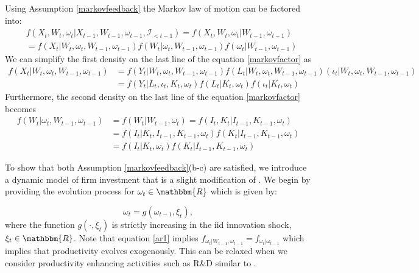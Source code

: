 \documentclass{article}
\begin{document}
Using Assumption \eqref{markovfeedback} the Markov law of motion can be factored into:
\begin{equation} \label{markovfactor}
    \begin{split}
        &f(X_{t}, W_{t}, \omega_{t}|X_{t-1}, W_{t-1}, \omega_{t-1}, \mathcal{I}_{<t-1})=f(X_{t}, W_{t}, \omega_{t}|W_{t-1}, \omega_{t-1})\\
        &=f(X_{t}|W_{t}, \omega_{t}, W_{t-1}, \omega_{t-1})f(W_{t}|\omega_{t}, W_{t-1}, \omega_{t-1})f(\omega_{t}|W_{t-1}, \omega_{t-1})
    \end{split}
\end{equation} 
We can simplify the first density on the last line of the equation \eqref{markovfactor} as
\begin{equation} \label{1stdensity}
\begin{split}
f(X_{t}|W_{t}, \omega_{t}, W_{t-1}, \omega_{t-1})&=f(Y_{t}|W_{t}, \omega_{t}, W_{t-1}, \omega_{t-1})f(L_{t}|W_{t}, \omega_{t}, W_{t-1}, \omega_{t-1})(\iota_{t}|W_{t}, \omega_{t}, W_{t-1}, \omega_{t-1})\\
&=f(Y_{t}|L_{t}, \iota_{t}, K_{t}, \omega_{t})f(L_{t}|K_{t}, \omega_{t})f(\iota_{t}|K_{t}, \omega_{t})
\end{split}
\end{equation}
Furthermore, the second density on the last line of the equation \eqref{markovfactor} becomes
\begin{equation} \label{2nddensity}
    \begin{split}
        f(W_{t}|\omega_{t}, W_{t-1}, \omega_{t-1})&=f(W_{t}|W_{t-1}, \omega_{t})=f(I_{t}, K_{t}|I_{t-1}, K_{t-1}, \omega_{t})\\
        &=f(I_{t}|K_{t}, I_{t-1}, K_{t-1}, \omega_{t})f(K_{t}|I_{t-1}, K_{t-1}, \omega_{t})\\
        &=f(I_{t}|K_{t}, \omega_{t})f(K_{t}|I_{t-1}, K_{t-1}, \omega_{t})
    \end{split}
\end{equation} 

To show that both Assumption \eqref{markovfeedback}(b-c) are satisfied, we introduce a dynamic model of firm investment that is a slight modification of \cite{Ericson1995}. We begin by providing the evolution process for $\omega_{t}\in \mathbbm{R}$ which is given by:

\begin{equation} \label{ar1}
\omega_{t}=g(\omega_{t-1}, \xi_{t}),
\end{equation}
where the function $g(\cdot, \xi_{t})$ is strictly increasing in the iid innovation shock, $\xi_{t}\in \mathbbm{R}$. Note that equation \eqref{ar1} implies $f_{\omega_{t}|W_{t-1}, \omega_{t-1}}=f_{\omega_{t}|\omega_{t-1}}$ which implies that productivity evolves exogenously. This can be relaxed when we consider productivity enhancing activities such as R\&D similar to \cite{Doraszelski2013}.\\
\end{document}
